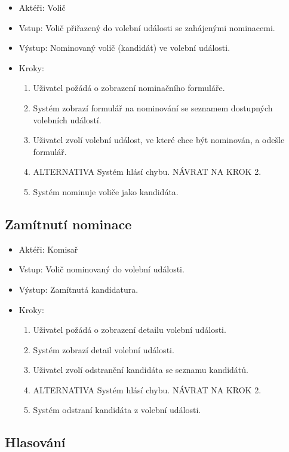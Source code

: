 \documentclass[11pt,twoside,a4paper]{book}
\begin{document}
\begin{itemize}
\item Aktéři: Volič
\item Vstup: Volič přiřazený do volební události se zahájenými nominacemi.
\item Výstup: Nominovaný volič (kandidát) ve volební události.
\item Kroky:
	\begin{enumerate}
		\item Uživatel požádá o zobrazení nominačního formuláře.
		\item Systém zobrazí formulář na nominování se seznamem dostupných volebních událostí.
		\item Uživatel zvolí volební událost, ve které chce být nominován, a odešle formulář.		
		\item ALTERNATIVA Systém hlásí chybu. NÁVRAT NA KROK 2.
		\item Systém nominuje voliče jako kandidáta.
	\end{enumerate}
\end{itemize}

\subsection{Zamítnutí nominace}

\begin{itemize}
\item Aktéři: Komisař
\item Vstup: Volič nominovaný do volební události.
\item Výstup: Zamítnutá kandidatura.
\item Kroky:
	\begin{enumerate}
		\item Uživatel požádá o zobrazení detailu volební události.
		\item Systém zobrazí detail volební události.
		\item Uživatel zvolí odstranění kandidáta se seznamu kandidátů.		
		\item ALTERNATIVA Systém hlásí chybu. NÁVRAT NA KROK 2.
		\item Systém odstraní kandidáta z volební události.
	\end{enumerate}
\end{itemize}

\subsection{Hlasování}
\end{document}
